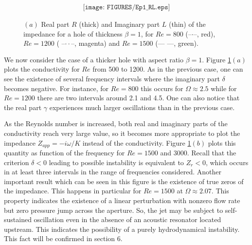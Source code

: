 \documentclass{jfm}
\begin{document}
\begin{figure}
$$
\begin{array}{cc}
\texttt{[image: FIGURES/Ep1\_RL.eps]}
\end{array}
$$
\caption{ 
$(a)$ Real part $R$ (thick) and Imaginary part $L$ (thin) of the impedance for a hole of thickness
$\beta = 1$, for $Re = 800$ (--$\cdot$--, red), $Re = 1200$ ( --$ \cdot \cdot$--, magenta) and $Re = 1500$ (---  ---, green).
}
\label{fig:Cond1}
\end{figure}

We now consider the case of a thicker hole with aspect ratio $\beta = 1$. Figure \ref{fig:Cond1}$(a)$ plots the conductivity for $Re$ from 500 to 1200. As in the previous case, one can see the existence of several frequency intervals where the imaginary part $\delta$ becomes negative. For instance, for $Re = 800$ this occurs for $\Omega \approx 2.5$ while for $Re = 1200$ there are two intervals around 2.1 and 4.5. One can also notice that the real part $\gamma$ experiences much larger oscillations than in the previous case. 

As the Reynolds number is increased, both real and imaginary parts of the conductivity reach very large value, so it becomes more appropriate to plot the impedance $Z_{app} = -i \omega/K$ instead of the conductivity. Figure \ref{fig:Cond1}$(b)$ plots this quantity as function of the frequency for $Re = 1500$ and $3000$.
Recall that the criterion $\delta<0$ leading to possible instability is equivalent to $Z_r<0$, which occurs in at least three intervals in the range of frequencies considered. Another important result which can be seen in this figure is the existence of true zeros of the impedance. This happens in particular for $Re = 1500$ at $\Omega \approx 2.07$. This property indicates the existence of a linear perturbation with nonzero flow rate but zero pressure jump across the aperture. So, the jet may be subject to self-sustained oscillation even in the absence of an acoustic resonator located upstream. This indicates the possibility of a purely hydrodynamical instability. This fact will be confirmed in section 6.
\end{document}
